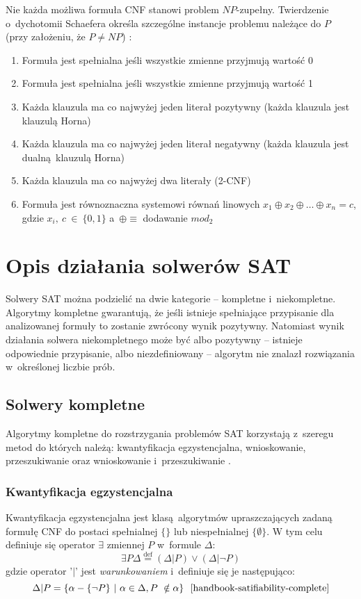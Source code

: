 Nie każda możliwa formuła CNF stanowi problem $NP$-zupełny. Twierdzenie o~dychotomii Schaefera określa 
szczególne instancje problemu należące do $P$ (przy założeniu, że $P \neq NP$) \cite{schaefer-dichotomy}:

\begin{enumerate}
    \item Formuła jest spełnialna jeśli wszystkie zmienne przyjmują wartość 0
    \item Formuła jest spełnialna jeśli wszystkie zmienne przyjmują wartość 1
    \item Każda klauzula ma co najwyżej jeden literał pozytywny (każda klauzula jest klauzulą Horna)
    \item Każda klauzula ma co najwyżej jeden literał negatywny (każda klauzula jest dualną klauzulą Horna)
    \item Każda klauzula ma co najwyżej dwa literały (2-CNF)
    \item Formuła jest równoznaczna systemowi równań linowych $x_1 \oplus x_2 \oplus \dots \oplus x_n = c$, gdzie
    $x_i,~c~\in~\{0, 1\}$ a~$\oplus \equiv$ dodawanie $mod_2$
    
\end{enumerate}

\section{Opis działania solwerów SAT}
Solwery SAT można podzielić na dwie kategorie -- kompletne i~niekompletne.
Algorytmy kompletne gwarantują, że jeśli istnieje spełniające przypisanie dla analizowanej formuły to zostanie zwrócony wynik pozytywny.
Natomiast wynik działania solwera niekompletnego może być albo pozytywny -- istnieje odpowiednie przypisanie, albo niezdefiniowany -- algorytm nie
znalazł rozwiązania w~określonej liczbie prób.

\subsection{Solwery kompletne}
Algorytmy kompletne do rozstrzygania problemów SAT korzystają z~szeregu metod do których należą: 
kwantyfikacja egzystencjalna, wnioskowanie, przeszukiwanie oraz wnioskowanie i~przeszukiwanie \cite{handbook-satifiability-complete}.

\subsubsection{Kwantyfikacja egzystencjalna}
Kwantyfikacja egzystencjalna jest klasą algorytmów upraszczających zadaną formułę CNF do postaci spełnialnej $\{\}$ lub niespełnialnej $\{\emptyset\}$.
W tym celu definiuje się operator $\exists$ zmiennej $P$ w~formule $\Delta$:
\[ \exists P \Delta \stackrel{\text{def}}{=} (\Delta | P) \lor (\Delta | \neg P) \]
gdzie operator '$|$' jest \textit{warunkowaniem} i~definiuje się je następująco:
\[ \Delta | P = \{\alpha - \{\neg P\}~|~\alpha \in \Delta, P~\notin \alpha\} ~~\text{\cite{handbook-satifiability-complete}} \] 

